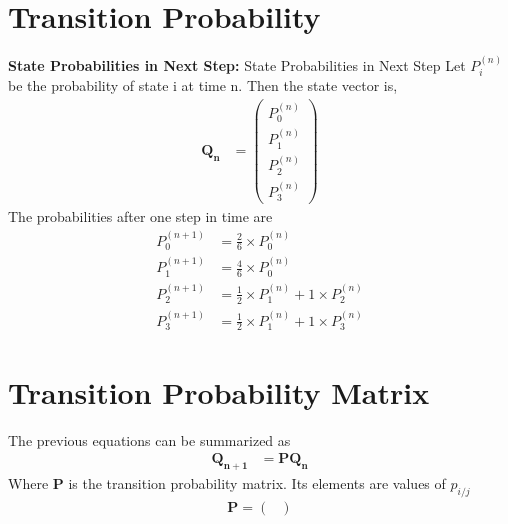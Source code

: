 \documentclass[journal,12pt,two column]{IEEEtran}
\providecommand{\prt}[2]{\ensuremath{P_{#1}^{\left(#2\right)} }}        %
\theoremstyle{remark}
\newcommand{\myvec}[1]{\ensuremath{\begin{pmatrix}#1\end{pmatrix}}}
\let\vec\mathbf
\begin{document}
\section{Transition Probability}
\textbf{State Probabilities in Next Step:}
{State Probabilities in Next Step}
    Let $\prt{i}{n}$ be the probability of state i at time n. 
    Then the state vector is,   
    \begin{align}
        \vec{Q_n} &= \myvec{\prt{0}{n}\\ 
        			        \prt{1}{n} \\
        			        \prt{2}{n} \\
        			        \prt{3}{n} 
        			        }        
    \end{align}    
    The probabilities after one step in time are
    \begin{align}
       \prt{0}{n+1} &= \frac{2}{6} \times \prt{0}{n}  \\
       \prt{1}{n+1} &= \frac{4}{6} \times \prt{0}{n}  \\
       \prt{2}{n+1} &= \frac{1}{2} \times \prt{1}{n} + 1 \times \prt{2}{n}
\\
       \prt{3}{n+1} &= \frac{1}{2} \times \prt{1}{n} + 1 \times \prt{3}{n} 
    \end{align}
    
\section{Transition Probability Matrix}

    The previous equations can be summarized as
    \begin{align}
        \vec{Q_{n+1}} &= \vec{P}\vec{Q_n} 
        \label{eq:transtition}        
    \end{align}
    Where $\vec{P}$ is the transition probability matrix. Its elements are values of $p_{i/j}$
    \begin{align}
        \vec{P}= \myvec{} 
    \end{align}
\end{document}
